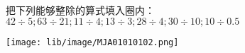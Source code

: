 把下列能够整除的算式填入圈内：\\
$42\div5;63\div21;11\div4;13\div3;28\div4;30\div10;10\div0.5$\\
\begin{center}
	\texttt{[image: lib/image/MJA01010102.png]}
	\vspace{0.5cm}
\end{center}
